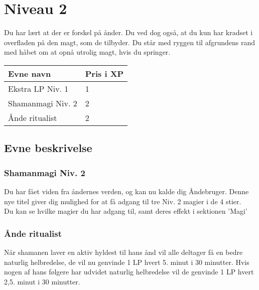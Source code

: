 \chapter{Niveau 2}
Du har lært at der er forskel på ånder. Du ved dog også, at du kun har kradset i overfladen på den magt, som de tilbyder. Du står med ryggen til afgrundens rand med håbet om at opnå utrolig magt, hvis du springer.

\begin{table}[H]
    \centering
    \begin{tabular}{|p{}|p{}|}
    \rowcolor{cerulean!80}\hline
        Evne navn & Pris i XP \\\hline
    Ekstra LP Niv. 1 & 1 \\\hline
    Shamanmagi Niv. 2& 2 \\\hline
    Ånde ritualist& 2 \\\hline
    \end{tabular}
\end{table}
\section{Evne beskrivelse}



\subsection{Shamanmagi Niv. 2}
Du har fået viden fra åndernes verden, og kan nu kalde dig Åndebruger. Denne nye titel giver dig mulighed for at få adgang til tre Niv. 2 magier i de 4 stier.\\
Du kan se hvilke magier du har adgang til, samt deres effekt i sektionen 'Magi'\\

\subsection{Ånde ritualist}
Når shamanen laver en aktiv hyldest til hans ånd vil alle deltager få en bedre naturlig helbredelse, de vil nu genvinde 1 LP hvert 5. minut i 30 minutter. Hvis nogen af hans følgere har udvidet naturlig helbredelse vil de genvinde 1 LP hvert 2,5. minut i 30 minutter.

